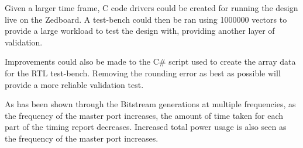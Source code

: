 \documentclass[conference]{IEEEtran}
\begin{document}
Given a larger time frame, C code drivers could be created for running the design live on the Zedboard.  A test-bench could then be ran using 1000000 vectors to provide a large workload to test the design with, providing another layer of validation.
\newline

Improvements could also be made to the C\# script used to create the array data for the RTL test-bench. Removing the rounding error as best as possible will provide a more reliable validation test.
\newline

As has been shown through the Bitstream generations at multiple frequencies, as the frequency of the master port increases, the amount of time taken for each part of the timing report decreases. Increased total power usage is also seen as the frequency of the master port increases. 


\begin{thebibliography}{1}

\end{thebibliography}
\appendices
\end{document}
